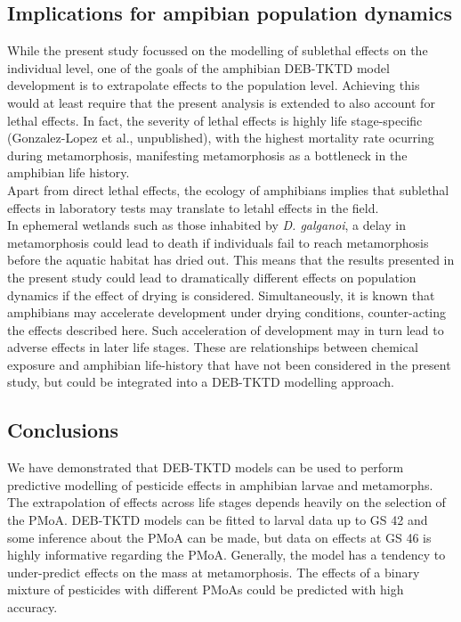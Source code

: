 \subsection{Implications for ampibian population dynamics}
\noindent
While the present study focussed on the modelling of sublethal effects on the individual level, 
one of the goals of the amphibian DEB-TKTD model development is to extrapolate effects to the population level.
Achieving this would at least require that the present analysis is extended to also account for lethal effects. 
In fact, the severity of lethal effects is highly life stage-specific (Gonzalez-Lopez et al., unpublished), 
with the highest mortality rate ocurring during metamorphosis, 
manifesting metamorphosis as a bottleneck in the amphibian life history.\\ 
Apart from direct lethal effects, the ecology of amphibians implies that sublethal effects in laboratory tests 
may translate to letahl effects in the field.\\
In ephemeral wetlands such as those inhabited by \textit{D. galganoi},
a delay in metamorphosis could lead to death if individuals fail to reach metamorphosis 
before the aquatic habitat has dried out. 
This means that the results presented in the present study could lead 
to dramatically different effects on population dynamics if the effect of drying is considered. 
Simultaneously, it is known that amphibians may accelerate development under drying conditions, 
counter-acting the effects described here. 
Such acceleration of development may in turn lead to adverse effects in later life stages. 
These are relationships between chemical exposure and amphibian life-history that have not been considered 
in the present study, but could be integrated into a DEB-TKTD modelling approach.
%
\subsection{Conclusions}
\noindent 
We have demonstrated that DEB-TKTD models can be used to perform predictive modelling 
of pesticide effects in amphibian larvae and metamorphs.
The extrapolation of effects across life stages depends heavily on the selection of the PMoA. 
DEB-TKTD models can be fitted to larval data up to GS 42 and some inference about the PMoA can be made, 
but data on effects at GS 46 is highly informative regarding the PMoA.
Generally, the model has a tendency to under-predict effects on the mass at metamorphosis. 
The effects of a binary mixture of pesticides with different PMoAs could be predicted with high accuracy.